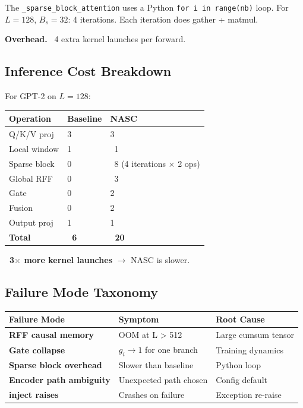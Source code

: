 The \texttt{\_sparse\_block\_attention} uses a Python \texttt{for i in range(nb)} loop. For 
$L = 128$, $B_s = 32$: 4 iterations. Each iteration does gather + matmul.

\textbf{Overhead.} ~4 extra kernel launches per forward.

\subsection{Inference Cost Breakdown}

For GPT-2 on $L = 128$:

\begin{table}[H]
\centering
\small
\begin{tabular}{lll}
\toprule
\textbf{Operation} & \textbf{Baseline} & \textbf{NASC} \\
\midrule
Q/K/V proj & 3 & 3 \\
Local window & 1 & ~1 \\
Sparse block & 0 & ~8 (4 iterations $\times$ 2 ops) \\
Global RFF & 0 & ~3 \\
Gate & 0 & 2 \\
Fusion & 0 & 2 \\
Output proj & 1 & 1 \\
\textbf{Total} & \textbf{~6} & \textbf{~20} \\
\bottomrule
\end{tabular}
\end{table}

\textbf{~3$\times$ more kernel launches} $\to$ NASC is slower.

\subsection{Failure Mode Taxonomy}

\begin{table}[H]
\centering
\small
\begin{tabular}{lll}
\toprule
\textbf{Failure Mode} & \textbf{Symptom} & \textbf{Root Cause} \\
\midrule
\textbf{RFF causal memory} & OOM at L > 512 & Large cumsum tensor \\
\textbf{Gate collapse} & $g_i \to 1$ for one branch & Training dynamics \\
\textbf{Sparse block overhead} & Slower than baseline & Python loop \\
\textbf{Encoder path ambiguity} & Unexpected path chosen & Config default \\
\textbf{inject raises} & Crashes on failure & Exception re-raise \\
\bottomrule
\end{tabular}
\end{table}

